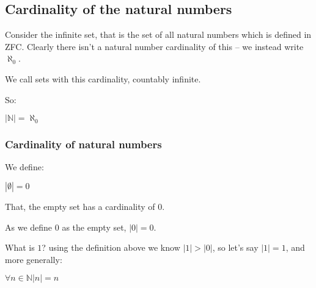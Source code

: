 
\subsection{Cardinality of the natural numbers}

Consider the infinite set, that is the set of all natural numbers which is defined in ZFC. Clearly there isn’t a natural number cardinality of this – we instead write \(\aleph_0\).

We call sets with this cardinality, countably infinite.

So:

\(|\mathbb{N} |=\aleph_0\)

\subsubsection{Cardinality of natural  numbers}

We define:

$|\emptyset |=0$

That, the empty set has a cardinality of \(0\).

As we define \(0\) as the empty set, \(|0|=0\).

What is \(1\)? using the definition above we know \(|1|>|0|\), so let's say \(|1|=1\), and more generally:

$\forall n \in \mathbb{N} |n|=n$

